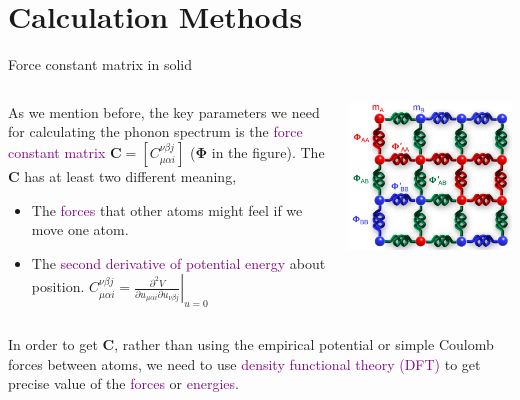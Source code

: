 \documentclass{beamer}
\begin{document}

\section{Calculation Methods}

\begin{frame}{Force constant matrix in solid}
  \begin{columns}
    \begin{column}{0.6\textwidth}
      As we mention before, the key parameters we need for calculating the phonon spectrum is the \textcolor{purple}{force constant matrix} \(\bm{C} = [C^{\nu\beta{}j}_{\mu\alpha{}i}]\) (\(\bm{\Phi}\) in the figure). 
  The \(\bm{C}\) has at least two different meaning, 
  \begin{itemize}
    \item The \textcolor{purple}{forces} that other atoms might feel if we move one atom.
    \item The \textcolor{purple}{second derivative of potential energy} about position. \(C^{\nu\beta{}j}_{\mu\alpha{}i} = \left.\frac{\partial^2V}{\partial{}u_{\mu\alpha{}i}\partial{}u_{\nu\beta{}j}}\right|_{u=0}\) 
     \end{itemize}
    \end{column}
    \begin{column}{0.4\textwidth}
      \includegraphics[width=\textwidth]{figure/fc.png}
    \end{column}
  \end{columns}
  \begin{block}{}
    In order to get \(\bm{C}\), rather than using the empirical potential or simple Coulomb forces between atoms, we need to use \textcolor{purple}{density functional theory (DFT)} to get precise value of the \textcolor{purple}{forces} or \textcolor{purple}{energies}.
  \end{block}
\end{frame}
\end{document}
